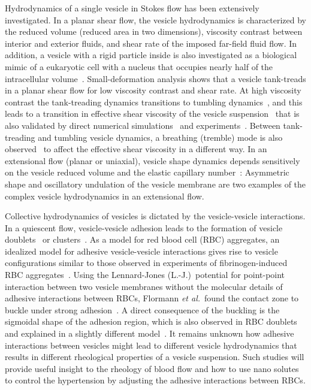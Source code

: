 \documentclass[prf,superscriptaddress,showpacs]{revtex4-1}
\begin{document}
Hydrodynamics of a single vesicle in Stokes flow has been extensively
investigated. In a planar shear flow, the vesicle hydrodynamics is
characterized by the reduced volume (reduced area in two dimensions),
viscosity contrast between interior and exterior fluids, and shear rate
of the imposed far-field fluid flow. In addition, a vesicle with a rigid
particle inside is also investigated as a biological mimic of a
eukaryotic cell with a nucleus that occupies nearly half of the
intracellular volume~\cite{Veerapaneni2011_PRL}. Small-deformation
analysis shows that a vesicle tank-treads in a planar shear flow for low
viscosity contrast and shear rate. At high viscosity contrast the
tank-treading dynamics transitions to tumbling
dynamics~\cite{Misbah2006_PRL, Vlahovska2007_PRE}, and this leads to a
transition in effective shear viscosity of the vesicle
suspension~\cite{Misbah2006_PRL,Vitkova2008_BJ} that is also validated
by direct numerical simulations~\cite{GhigliottiBibenMisbah2010_JFM} and
experiments~\cite{DeschampsKantsler2009_PNAS,
KantslerSegreSteinberg2008_EPL, ZabuskySegreDeschamps2011_PoF}.  Between
tank-treading and tumbling vesicle dynamics, a breathing (tremble) mode
is also observed~\cite{Misbah2006_PRL, KantslerSegreSteinberg2008_PRL,
ZhaoShaqfeh2011_JFM, SpannZhaoShaqfeh2014_PoF} to affect the effective
shear viscosity in a different way.  In an extensional flow (planar or
uniaxial), vesicle shape dynamics depends sensitively on the vesicle
reduced volume and the elastic capillary
number~\cite{KantslerSegreSteinberg2008_PRL, ZhaoShaqfeh2013_JFM,
Narsimhan2014_JFM, DahlNarsimhanGouveia2016_SoftMatt}: Asymmetric shape
and oscillatory undulation of the vesicle membrane are two examples of
the complex vesicle hydrodynamics in an extensional flow.

Collective hydrodynamics of vesicles is dictated by the vesicle-vesicle
interactions.  In a quiescent flow, vesicle-vesicle adhesion leads to
the formation of vesicle doublets~\cite{Ziherl2007_PRL,
ZiherlSvetina2007_PNAS} or
clusters~\cite{SvetinaZiherl2008_Bioelectrochemistry,
FlormannAouane2017_SciReports}.  As a model for red blood cell (RBC)
aggregates, an idealized model for adhesive vesicle-vesicle interactions
gives rise to vesicle configurations similar to those observed in
experiments of fibrinogen-induced RBC
aggregates~\cite{SvetinaZiherl2008_Bioelectrochemistry,
FlormannAouane2017_SciReports}.  Using the Lennard-Jones
(L.-J.)~potential for point-point interaction between two vesicle
membranes without the molecular details of adhesive interactions between
RBCs, Flormann {\em et al.}~found the contact zone to buckle under
strong adhesion~\cite{FlormannAouane2017_SciReports}.  A direct
consequence of the buckling is the sigmoidal shape of the adhesion
region, which is also observed in RBC doublets and explained in a
slightly different model~\cite{ZiherlSvetina2007_PNAS}.  It remains
unknown how adhesive interactions between vesicles might lead to
different vesicle hydrodynamics that results in different rheological
properties of a vesicle suspension. Such studies will provide useful
insight to the rheology of blood flow and how to use nano solutes to
control the hypertension by adjusting the adhesive interactions between
RBCs.
\end{document}
